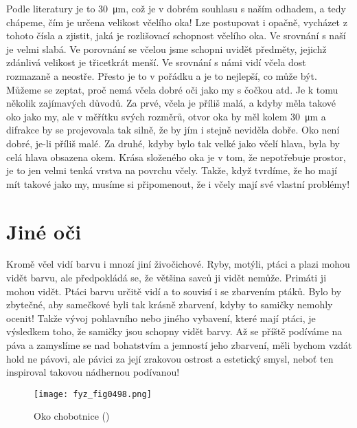     Podle literatury je to \SI{30}{\micro\m}, což je v dobrém souhlasu s naším odhadem, a tedy
    chápeme, čím je určena velikost včelího oka! Lze postupovat i opačně, vycházet z tohoto čísla a
    zjistit, jaká je rozlišovací schopnost včelího oka. Ve srovnání s naší je velmi slabá. Ve
    porovnání se včelou jsme schopni uvidět předměty, jejichž zdánlivá velikost je třicetkrát menší.
    Ve srovnání s námi vidí včela dost rozmazaně a neostře. Přesto je to v pořádku a je to nejlepší,
    co může být. Můžeme se zeptat, proč nemá včela dobré oči jako my s čočkou atd. Je k tomu několik
    zajímavých důvodů. Za prvé, včela je příliš malá, a kdyby měla takové oko jako my, ale v měřítku
    svých rozměrů, otvor oka by měl kolem \SI{30}{\micro\m} a difrakce by se projevovala tak silně,
    že by jím i stejně neviděla dobře. Oko není dobré, je-li příliš malé. Za druhé, kdyby bylo tak
    velké jako včelí hlava, byla by celá hlava obsazena okem. Krása složeného oka je v tom, že
    nepotřebuje prostor, je to jen velmi tenká vrstva na povrchu včely. Takže, když tvrdíme, že ho
    mají mít takové jako my, musíme si připomenout, že i včely mají své vlastní problémy!

  \section{Jiné oči}\label{fyz:IchapXXXVIsecV}
    Kromě včel vidí barvu i mnozí jiní živočichové. Ryby, motýli, ptáci a plazi mohou vidět barvu,
    ale předpokládá se, že většina savců ji vidět nemůže. Primáti ji mohou vidět. Ptáci barvu určitě
    vidí a to souvisí i se zbarvením ptáků. Bylo by zbytečné, aby samečkové byli tak krásně
    zbarvení, kdyby to samičky nemohly ocenit! Takže vývoj pohlavního nebo jiného vybavení, které
    mají ptáci, je výsledkem toho, že samičky jsou schopny vidět barvy. Až se příště podíváme na
    páva a zamyslíme se nad bohatstvím a jemností jeho zbarvení, měli bychom vzdát hold ne pávovi,
    ale pávici za její zrakovou ostrost a estetický smysl, neboť ten inspiroval takovou nádhernou
    podívanou!

    \begin{figure}[ht!] %
      \centering
      \texttt{[image: fyz\_fig0498.png]}
      \caption{Oko chobotnice (\cite[s.~697]{Feynman01})}
      \label{fyz:fig0498}
    \end{figure}

